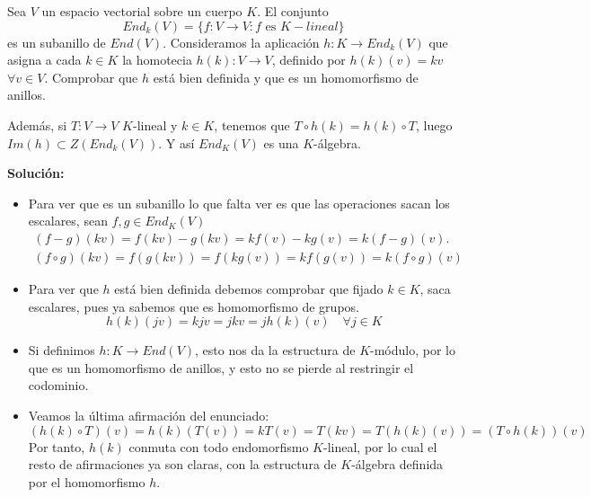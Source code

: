 \begin{ejercicio}
    Sea $V$ un espacio vectorial sobre un cuerpo $K$. El conjunto
    \begin{equation*}
        End_k(V) =\{f:V\rightarrow V : f \text{\ es\ } K-lineal\}
    \end{equation*}
    es un subanillo de $End(V)$. Consideramos la aplicación $h:K \rightarrow End_k(V)$ que asigna a cada $k \in K$ la homotecia $h(k):V \rightarrow V$, definido por $h(k)(v) = kv$ $\forall v \in V$. Comprobar que $h$ está bien definida y que es un homomorfismo de anillos. 

    Además, si $T:V \rightarrow V$ $K$-lineal y $k \in K$, tenemos que $T \circ h(k) = h(k) \circ T$, luego $Im(h) \subset Z(End_k(V))$. Y así $End_K(V)$ es una $K$-álgebra.

\noindent
\textbf{Solución:}
\begin{itemize}
    \item Para ver que es un subanillo lo que falta ver es que las operaciones sacan los escalares, sean $f, g \in End_K(V)$
        \begin{gather*}
            (f-g)(kv) = f(kv) - g(kv) = kf(v) - kg(v) = k (f-g)(v). \\
            (f \circ g) (kv) = f(g(kv)) = f(kg(v))= kf(g(v)) = k(f\circ g)(v)
        \end{gather*}

    \item Para ver que $h$ está bien definida debemos comprobar que fijado $k \in K$, saca escalares, pues ya sabemos que es homomorfismo de grupos.
        \begin{equation*}
            h(k)(jv) = kjv = jkv = jh(k)(v) \quad \forall j \in K
        \end{equation*}
    \item Si definimos $h : K \to End(V)$, esto nos da la estructura de $K$-módulo, por lo que es un homomorfismo de anillos, y esto no se pierde al restringir el codominio. 
    \item Veamos la última afirmación del enunciado:
        \begin{equation*}
            (h(k)\circ T)(v) = h(k)(T(v)) = kT(v) = T(kv) = T(h(k)(v)) = (T \circ h(k))(v)
        \end{equation*}
        Por tanto, $h(k)$ conmuta con todo endomorfismo $K$-lineal, por lo cual el resto de afirmaciones ya son claras, con la estructura de $K$-álgebra definida por el homomorfismo $h$. 
\end{itemize}
\end{ejercicio} 

